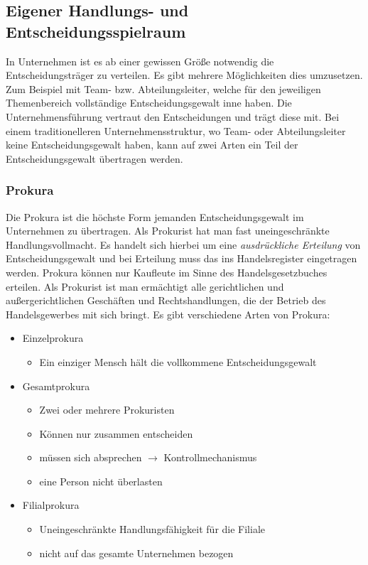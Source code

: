 \documentclass[]{article}
\begin{document}
\newpage
\subsection{Eigener Handlungs- und Entscheidungsspielraum}

In Unternehmen ist es ab einer gewissen Größe notwendig die Entscheidungsträger zu verteilen. Es gibt mehrere Möglichkeiten dies umzusetzen. Zum Beispiel mit Team- bzw. Abteilungsleiter, welche für den jeweiligen Themenbereich vollständige Entscheidungsgewalt inne haben. Die Unternehmensführung vertraut den Entscheidungen und trägt diese mit. Bei einem traditionelleren Unternehmensstruktur, wo Team- oder Abteilungsleiter keine Entscheidungsgewalt haben, kann auf zwei Arten ein Teil der Entscheidungsgewalt übertragen werden.

\subsubsection{Prokura}
Die Prokura ist die höchste Form jemanden Entscheidungsgewalt im Unternehmen zu übertragen. Als Prokurist hat man fast uneingeschränkte Handlungsvollmacht. Es handelt sich hierbei um eine \textit{ausdrückliche Erteilung} von Entscheidungsgewalt und bei Erteilung muss das ins Handelsregister eingetragen werden. Prokura können nur Kaufleute im Sinne des Handelsgesetzbuches erteilen.
Als Prokurist ist man ermächtigt alle gerichtlichen und außergerichtlichen Geschäften und Rechtshandlungen, die der Betrieb des Handelsgewerbes mit sich bringt.
Es gibt verschiedene Arten von Prokura:
\begin{itemize}
	\item Einzelprokura
	\begin{itemize}
		\item Ein einziger Mensch hält die vollkommene Entscheidungsgewalt
	\end{itemize}
	\item Gesamtprokura
	\begin{itemize}
		\item Zwei oder mehrere Prokuristen
		\item Können nur zusammen entscheiden
		\item müssen sich absprechen $\rightarrow$ Kontrollmechanismus
		\item eine Person nicht überlasten
	\end{itemize}
	\item Filialprokura 
	\begin{itemize}
		\item Uneingeschränkte Handlungsfähigkeit für die Filiale
		\item nicht auf das gesamte Unternehmen bezogen
	\end{itemize}
\end{itemize}
\end{document}

